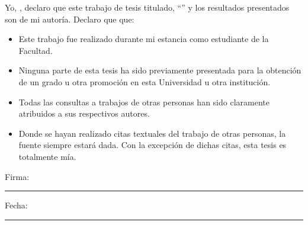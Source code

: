 \documentclass[
11pt, %
spanish, %
singlespacing, %
headsepline, %
]{MastersDoctoralThesis} %
\newcommand\blankpage{%
    \null
    \thispagestyle{empty}%
    \addtocounter{page}{-1}%
    \newpage}
\begin{document}

 


\afterpage{\blankpage}

\begin{declaration}
\addchaptertocentry{\authorshipname} %
\noindent Yo, \authorname, declaro que este trabajo de tesis titulado, \enquote{\ttitle} y los resultados presentados son de mi autoría. Declaro que que:

\begin{itemize} 
\item Este trabajo fue realizado durante mi estancia como estudiante de la Facultad.
\item Ninguna parte de esta tesis ha sido previamente presentada para la obtención de un grado u otra promoción en esta Universidad u otra institución.
\item Todas las consultas a trabajos de otras personas han sido claramente atribuidos a sus respectivos autores.
\item Donde se hayan realizado citas textuales del trabajo de otras personas, la fuente siempre estará dada. Con la excepción de dichas citas, esta tesis es totalmente mía.
\end{itemize}
 
\noindent Firma:\\
\rule[0.5em]{25em}{0.5pt} %
 
\noindent Fecha:\\
\rule[0.5em]{25em}{0.5pt} %

\afterpage{\blankpage}

\end{declaration}

\newpage
\vspace*{0.4\textheight}
\end{document}
